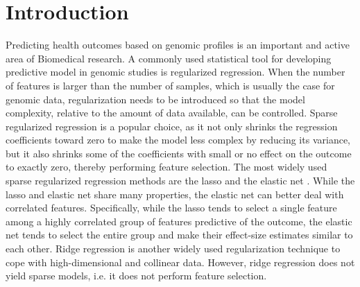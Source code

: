 \section{Introduction}
Predicting health outcomes based on genomic profiles is an important and active area of Biomedical research. A commonly used statistical tool for developing predictive model in genomic studies is regularized regression. When the number of features is larger than the number of samples, which is usually the case for genomic data, regularization needs to be introduced so that the model complexity, relative to the amount of data available, can be controlled. Sparse regularized regression is a popular choice, as it not only shrinks the regression coefficients toward zero to make the model less complex by reducing its variance, but it also shrinks some of the coefficients with small or no effect on the outcome to exactly zero, thereby performing feature selection. The most widely used  sparse regularized regression methods are the lasso \citep{tibshirani1996regression} and the elastic net \citep{zou2005regularization}. While the lasso and elastic net share many properties, the elastic net can better deal with correlated features. Specifically,  while the lasso tends to select a single feature among a highly correlated group of features predictive of the outcome, the elastic net tends to select the entire group and make their effect-size estimates similar to each other. Ridge regression \citep{hoerl1970ridge} is another widely used regularization technique to cope with high-dimensional and collinear data. However, ridge regression does not yield sparse models, i.e. it does not perform feature selection. 

